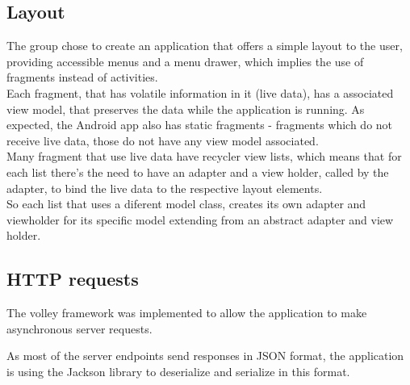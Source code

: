 \subsection{Layout}

The group chose to create an application that offers a simple layout to the user, providing accessible menus and a
menu drawer, which implies the use of fragments instead of activities.\\

Each fragment, that has volatile information in it (live data), has a associated view model, that preserves the data while the application is running. 
As expected, the Android app also has static fragments - fragments which do not receive live data, those do not have any view model associated.\\

Many fragment that use live data have recycler view lists, which means that for each list there's the need to have an adapter and a view holder, called by the adapter,
to bind the live data to the respective layout elements.\\

So each list that uses a diferent model class, creates its own adapter and viewholder for its specific model extending from an abstract adapter and view holder.

\subsection{HTTP requests}

The volley framework was implemented to allow the application to make asynchronous server requests.

As most of the server endpoints send responses in JSON format, the application is using the Jackson library to deserialize and serialize in this format.